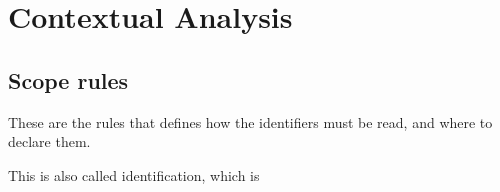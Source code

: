 \section{Contextual Analysis}

	\subsection{Scope rules}
	These are the rules that defines how the identifiers must be read, and where to declare them.
	
	This is also called identification, which is 
	
	
	

